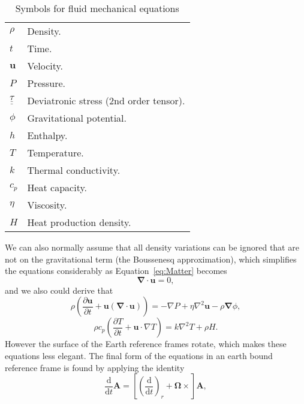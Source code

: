 \begin{table}[h!]
    \centering
    \begin{tabular}{ll}
        $\rho$ & Density. \\
        $t$ & Time. \\
        $\mathbf{u}$ & Velocity. \\
        $P$ & Pressure. \\
        $\underline{\underline{\tau}}$ & Deviatronic stress (2nd order tensor). \\
        $\phi$ & Gravitational potential. \\
         $h$ & Enthalpy.\\
         $T$ & Temperature. \\
         $k$ & Thermal conductivity.\\
         $c_p$ & Heat capacity.\\
         $\eta$ & Viscosity. \\
         $H$ & Heat production density.\\
    \end{tabular}
    \caption{Symbols for fluid mechanical equations}
    \label{tab:fluid_variables}
\end{table}
We can also normally assume that all density variations can be ignored that
 are not on the gravitational term (the Boussenesq approximation),
  which simplifies the equations considerably as Equation~\ref{eq:Matter} becomes
\begin{equation}
    \boldsymbol{\nabla}\cdot\mathbf{u} = 0, \tag{B-Matter}
\end{equation}
and we also could derive that
\begin{equation}
\rho\left (\frac{\partial \mathbf{u}}{\partial t}
+ \mathbf{u}(\boldsymbol{\nabla}\cdot \mathbf{u})\right)=
-\nabla P+\eta \nabla^{2} \mathbf{u}-\rho \boldsymbol{\nabla}\phi, \tag{B-Momentum}
\end{equation}
\begin{equation}
\rho c_{p}\left(\frac{\partial T}{\partial t}
+\mathbf{u} \cdot \nabla T\right)=k \nabla^{2} T+\rho H. \tag{B-Energy}
\end{equation}
However the surface of the Earth reference frames rotate,
 which makes these equations less elegant.
  The final form of the equations in an earth bound reference frame
  is found by applying the identity
\begin{equation}
\frac{\mathrm{d}}{\mathrm{d} t} \boldsymbol{A}=
\left[\left(\frac{\mathrm{d}}{\mathrm{d} t}\right)_{r}
+\mathbf{\Omega} \times\right] \boldsymbol{A},
\end{equation}
